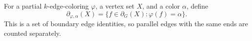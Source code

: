 \begin{definition}
For a partial $k$-edge-coloring $\varphi$, a vertex set $X$, and a color
$\alpha$, define
\[
 \partial_{\varphi,\alpha}(X)
   =\{f\in\partial_G(X):\varphi(f)=\alpha\}.
\]
This is a set of boundary edge identities, so parallel edges with the same
ends are counted separately.
\end{definition}

